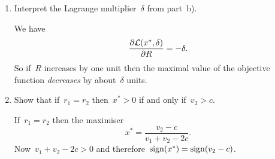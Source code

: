\begin{enumerate}
\begin{enumerate}
\begin{solution}
		\end{solution}

		\item
		Interpret the Lagrange multiplier~$\delta$ from part~b).
		\begin{solution}
			We have
			\[ \frac{\partial\mathcal{L}(x^*,\delta)}{\partial R}=-\delta. \]
			So if~$R$ increases by one unit then the maximal value of the objective function \emph{decreases} by about~$\delta$ units.
		\end{solution}

		\item
		Show that if~$r_1=r_2$ then~$x^*>0$ if and only if~$v_2>c$.
		\begin{solution}
			If~$r_1=r_2$ then the maximiser
			\[ x^*=\frac{v_2-c}{v_1+v_2-2c}. \]
			Now~$v_1+v_2-2c>0$ and therefore~$\operatorname{sign}(x^*)=\operatorname{sign}(v_2-c)$.
		\end{solution}

	\end{enumerate}

\end{enumerate}
